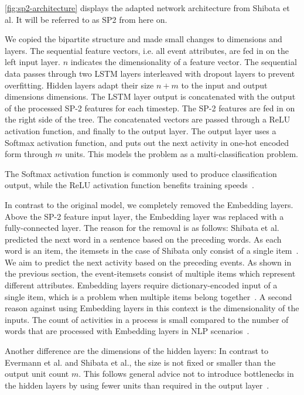 \autoref{fig:sp2-architecture} displays the adapted network architecture from Shibata et al. It will be referred to as SP2 from here on.

We copied the bipartite structure and made small changes to dimensions and layers.
The sequential feature vectors, i.e. all event attributes, are fed in on the left input layer.
$n$ indicates the dimensionality of a feature vector.
The sequential data passes through two LSTM layers interleaved with dropout layers to prevent overfitting.
Hidden layers adapt their size $n+m$ to the input and output dimensions dimensions.
The LSTM layer output is concatenated with the output of the processed SP-2 features for each timestep.
The SP-2 features are fed in on the right side of the tree.
The concatenated vectors are passed through a ReLU activation function, and
finally to the output layer. The output layer uses a Softmax activation function,
and puts out the next activity in one-hot encoded form through $m$ units.
This models the problem as a multi-classification problem.

The Softmax activation function is commonly used to produce classification output,
while the ReLU activation function benefits training speeds~\cite{krizhevsky2012imagenet}.

In contrast to the original model, we completely removed the Embedding layers.
Above the SP-2 feature input layer, the Embedding layer was replaced with a fully-connected layer.
The reason for the removal is as follows: Shibata et al. predicted the next word in a sentence based on the preceding words.
As each word is an item, the itemsets in the case of Shibata only consist of a single item~\cite{shibata2016bipartite}.
We aim to predict the next activity based on the preceding events.
As shown in the previous section, the event-itemsets consist of multiple items which represent different attributes.
Embedding layers require dictionary-encoded input of a single item, which is a problem when multiple items belong together~\cite{goldberg2014word2vec}. A second reason against using Embedding layers in this context is the dimensionality of the inputs. The count of activities in a process is small compared to the number of words that are processed with Embedding layers in NLP scenarios~\cite{goldberg2014word2vec}.

Another difference are the dimensions of the hidden layers: In contrast to Evermann et al. and Shibata et al., the size is not fixed or smaller than the output unit count $m$.
This follows general advice not to introduce bottlenecks in the hidden layers by using fewer units than required in the output layer~\cite{web:techniques-in-convnets,szegedy2016rethinking}.\\

